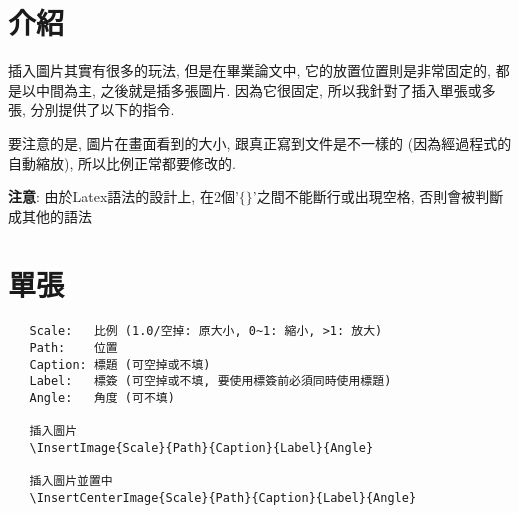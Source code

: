 \section{介紹}

插入圖片其實有很多的玩法, 但是在畢業論文中, 它的放置位置則是非常固定的, 都是以中間為主, 之後就是插多張圖片. 因為它很固定, 所以我針對了插入單張或多張, 分別提供了以下的指令.

要注意的是, 圖片在畫面看到的大小, 跟真正寫到文件是不一樣的 (因為經過程式的自動縮放), 所以比例正常都要修改的.

\textbf{注意}: 由於Latex語法的設計上, 在2個'$\lbrace\rbrace$'之間不能斷行或出現空格, 否則會被判斷成其他的語法

\section{單張}

  \begin{framed}
  \begin{verbatim}
   Scale:   比例 (1.0/空掉: 原大小, 0~1: 縮小, >1: 放大)
   Path:    位置
   Caption: 標題 (可空掉或不填)
   Label:   標簽 (可空掉或不填, 要使用標簽前必須同時使用標題)
   Angle:   角度 (可不填)

   插入圖片
   \InsertImage{Scale}{Path}{Caption}{Label}{Angle}

   插入圖片並置中
   \InsertCenterImage{Scale}{Path}{Caption}{Label}{Angle}
  \end{verbatim}
  \end{framed}

  \newpage

